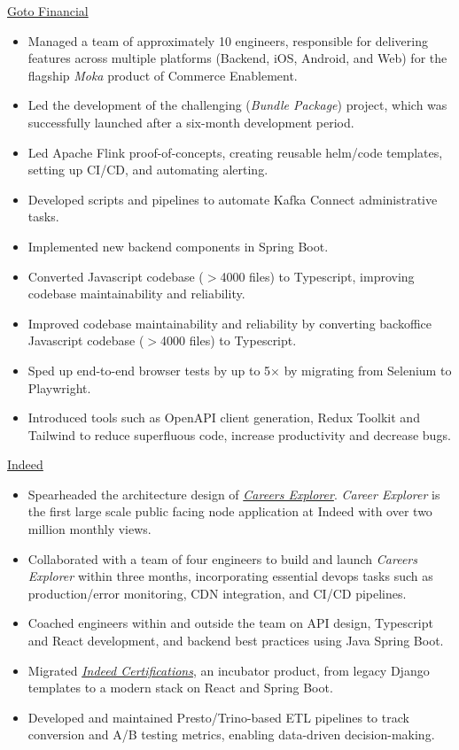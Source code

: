 \documentclass[]{cv} %
\begin{document}
\entry
{\href{https://gotofinancial.com/en}{Goto Financial}}
{
\begin{itemize}
\item Managed a team of approximately 10 engineers, responsible for delivering features across multiple platforms (Backend, iOS, Android, and Web) for the flagship \emph{Moka} product of Commerce Enablement.
\item Led the development of the challenging (\emph{Bundle Package}) project, which was successfully launched after a six-month development period.
\item Led Apache Flink proof-of-concepts, creating reusable helm/code templates, setting up CI/CD, and automating alerting.
\item Developed scripts and pipelines to automate Kafka Connect administrative tasks.
\item Implemented new backend components in Spring Boot.
\item Converted Javascript codebase ($> $4000 files) to Typescript, improving codebase maintainability and reliability.
\item Improved codebase maintainability and reliability by converting backoffice Javascript codebase ($> $4000 files) to Typescript.
\item Sped up end-to-end browser tests by up to 5$\times$ by migrating from Selenium to Playwright.
\item Introduced tools such as OpenAPI client generation, Redux Toolkit and Tailwind to reduce superfluous code, increase productivity and decrease bugs.
\end{itemize}
}

\entry
{\href{https://www.indeed.com/}{Indeed}}
{
\begin{itemize}
\item Spearheaded the architecture design of \href{https://www.indeed.com/career}{\emph{Careers Explorer}}. \emph{Career Explorer} is the first large scale public facing node application at Indeed with over two million monthly views.
\item Collaborated with a team of four engineers to build and launch \emph{Careers Explorer} within three months, incorporating essential devops tasks such as production/error monitoring, CDN integration, and CI/CD pipelines.
\item Coached engineers within and outside the team on API design, Typescript and React development, and backend best practices using Java Spring Boot.
\item Migrated \href{https://www.indeed.com/certifications/}{\emph{Indeed Certifications}}, an incubator product, from legacy Django templates to a modern stack on React and Spring Boot.
\item Developed and maintained Presto/Trino-based ETL pipelines to track conversion and A/B testing metrics, enabling data-driven decision-making.
\end{itemize}
}
\end{document}
